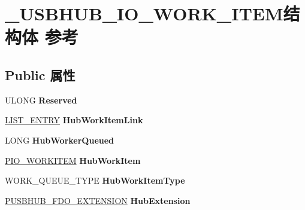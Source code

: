 \hypertarget{struct___u_s_b_h_u_b___i_o___w_o_r_k___i_t_e_m}{}\section{\+\_\+\+U\+S\+B\+H\+U\+B\+\_\+\+I\+O\+\_\+\+W\+O\+R\+K\+\_\+\+I\+T\+E\+M结构体 参考}
\label{struct___u_s_b_h_u_b___i_o___w_o_r_k___i_t_e_m}
\subsection*{Public 属性}
\begin{DoxyCompactItemize}
\item 
\mbox{\label{struct___u_s_b_h_u_b___i_o___w_o_r_k___i_t_e_m_a0e777ba36803c1c4b42b5c1886e4e0b2}} 
U\+L\+O\+NG {\bfseries Reserved}
\item 
\mbox{\label{struct___u_s_b_h_u_b___i_o___w_o_r_k___i_t_e_m_aa6ad35e268dc4a6e1875640996268e8d}} 
\hyperlink{struct___l_i_s_t___e_n_t_r_y}{L\+I\+S\+T\+\_\+\+E\+N\+T\+RY} {\bfseries Hub\+Work\+Item\+Link}
\item 
\mbox{\label{struct___u_s_b_h_u_b___i_o___w_o_r_k___i_t_e_m_abc415025466c638e7b381cff7074afba}} 
L\+O\+NG {\bfseries Hub\+Worker\+Queued}
\item 
\mbox{\label{struct___u_s_b_h_u_b___i_o___w_o_r_k___i_t_e_m_ad27a2a4b5bce9bfd50c223b49817fc73}} 
\hyperlink{struct___i_o___w_o_r_k_i_t_e_m}{P\+I\+O\+\_\+\+W\+O\+R\+K\+I\+T\+EM} {\bfseries Hub\+Work\+Item}
\item 
\mbox{\label{struct___u_s_b_h_u_b___i_o___w_o_r_k___i_t_e_m_a99dbb92a527e7557bf04af2312558a1b}} 
W\+O\+R\+K\+\_\+\+Q\+U\+E\+U\+E\+\_\+\+T\+Y\+PE {\bfseries Hub\+Work\+Item\+Type}
\item 
\mbox{\label{struct___u_s_b_h_u_b___i_o___w_o_r_k___i_t_e_m_a50ae9e197ba34f9e9dfc7158a8a0fd67}} 
\hyperlink{struct___u_s_b_h_u_b___f_d_o___e_x_t_e_n_s_i_o_n}{P\+U\+S\+B\+H\+U\+B\+\_\+\+F\+D\+O\+\_\+\+E\+X\+T\+E\+N\+S\+I\+ON} {\bfseries Hub\+Extension}

\end{DoxyCompactItemize}
